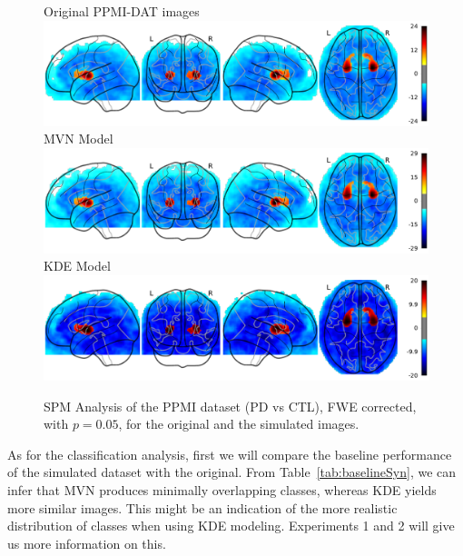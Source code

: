 \begin{figure}
	\centering
	Original PPMI-DAT images\\
	\includegraphics[width=\linewidth]{Graphics/ch8/NORvsPD_Orig_glass}\\
	\ac{MVN} Model\\
	\includegraphics[width=\linewidth]{Graphics/ch8/NORvsPD_MVN_glass}\\
	\ac{KDE} Model\\
	\includegraphics[width=\linewidth]{Graphics/ch8/NORvsPD_KDE_glass}
	\caption[\acs{SPM} Analysis of the PPMI dataset.]{\ac{SPM} Analysis of the PPMI dataset (\ac{PD} vs \ac{CTL}), \ac{FWE} corrected, with $p=0.05$, for the original and the simulated images.}
	\label{fig:spmPKS}
\end{figure}

As for the classification analysis, first we will compare the baseline performance of the simulated dataset with the original. From Table~\ref{tab:baselineSyn}, we can infer that \ac{MVN} produces minimally overlapping classes, whereas \ac{KDE} yields more similar images. This might be an indication of the more realistic distribution of classes when using \ac{KDE} modeling. Experiments 1 and 2 will give us more information on this.

